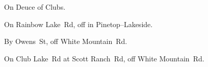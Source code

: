 
\begin{LocationList}

On   Deuce of Clubs.

\Location{\RestArea \Rest}
On Rainbow Lake~Rd, off  in Pinetop--Lakeside.

By Owens~St, off  White Mountain~Rd.

On Club Lake~Rd at Scott Ranch~Rd, off  White Mountain~Rd.

\end{LocationList}

